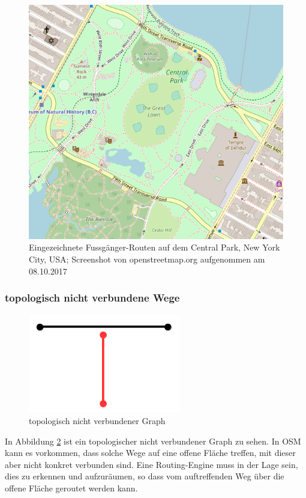 \begin{figure}[ht]
\centering
\includegraphics[width=0.5\linewidth]{technicalreport/img/central_park}
\caption[eingezeichnete Fussgänger-Routen]{Eingezeichnete Fussgänger-Routen auf dem Central Park, New York City, USA; Screenshot von openstreetmap.org aufgenommen am 08.10.2017}
\label{fig:central_park}
\end{figure}


\subsubsection{topologisch nicht verbundene Wege}
\label{subsub: topologisch nicht verbundene Wege}

\begin{figure}[ht]
\centering
\includegraphics[width=0.5\linewidth]{technicalreport/img/topologisch_nicht_verbundener_graph}
\caption[topologisch nicht verbundener Graph]{topologisch nicht verbundener Graph}
\label{fig:topologisch_nicht_verbundener_graph}
\end{figure}

In Abbildung \ref{fig:topologisch_nicht_verbundener_graph} ist ein topologischer nicht verbundener Graph zu sehen. In OSM kann es vorkommen, dass solche Wege auf eine offene Fläche treffen, mit dieser aber nicht konkret verbunden sind. Eine Routing-Engine muss in der Lage sein, dies zu erkennen und aufzuräumen, so dass vom auftreffenden Weg über die offene Fläche geroutet werden kann.

